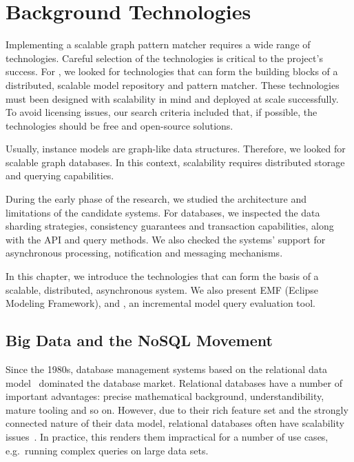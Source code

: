 \chapter{Background Technologies}
\label{chap:background-technologies}

Implementing a scalable graph pattern matcher requires a wide range of technologies. Careful selection of the technologies is critical to the project's success. For \iqd{}, we looked for technologies that can form the building blocks of a distributed, scalable model repository and pattern matcher. These technologies must been designed with scalability in mind and deployed at scale successfully. To avoid licensing issues, our search criteria included that, if possible, the technologies should be free and open-source solutions.

Usually, instance models are graph-like data structures. Therefore, we looked for scalable graph databases. In this context, scalability requires distributed storage and querying capabilities.

During the early phase of the research, we studied the architecture and limitations of the candidate systems. For databases, we inspected the data sharding strategies, consistency guarantees and transaction capabilities, along with the API and query methods. We also checked the systems' support for asynchronous processing, notification and messaging mechanisms.

In this chapter, we introduce the technologies that can form the basis of a scalable, distributed, asynchronous system. We also present EMF (Eclipse Modeling Framework), and \eiq{}, an incremental model query evaluation tool.

\section{Big Data and the NoSQL Movement}
\label{nosql}

Since the 1980s, database management systems based on the relational data model~\cite{Codd:1970:RMD:362384.362685} dominated the database market. Relational databases have a number of important advantages: precise mathematical background, understandibility, mature tooling and so on. However, due to their rich feature set and the strongly connected nature of their data model, relational databases often have scalability issues~\cite{Jacobs:2009:PBD:1536616.1536632, Sakr13}. In practice, this renders them impractical for a number of use cases, e.g.\ running complex queries on large data sets.


